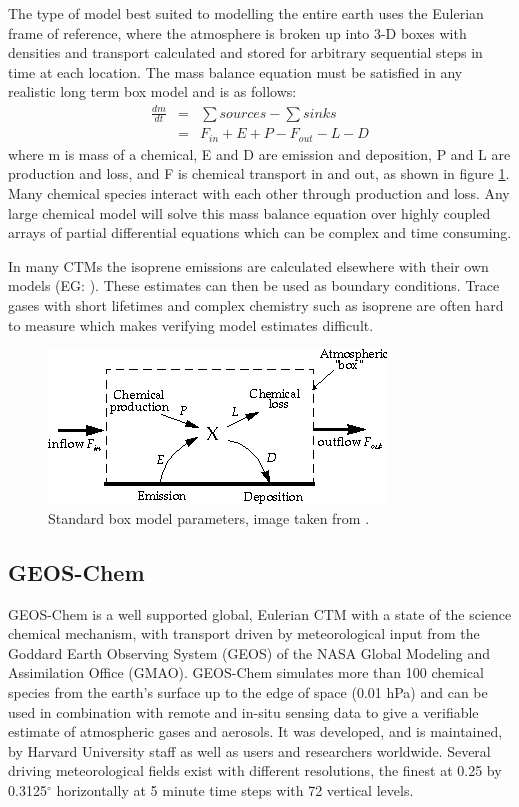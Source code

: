    The type of model best suited to modelling the entire earth uses the Eulerian frame of reference, where the atmosphere is broken up into 3-D boxes with densities and transport calculated and stored for arbitrary sequential steps in time at each location.
    The mass balance equation must be satisfied in any realistic long term box model and is as follows: 
    \begin{eqnarray*}
	\frac{dm}{dt} &=& \sum{sources}-\sum{sinks} \\
	&=& F_{in} + E + P - F_{out} - L - D 
    \end{eqnarray*}
    where m is mass of a chemical, E and D are emission and deposition, P and L are production and loss, and F is chemical transport in and out, as shown in figure \ref{ch1:fig:boxmodel}.
    Many chemical species interact with each other through production and loss. 
    Any large chemical model will solve this mass balance equation over highly coupled arrays of partial differential equations which can be complex and time consuming.

      
    In many CTMs the isoprene emissions are calculated elsewhere with their own models (EG: \citet{Guenther2006}). These estimates can then be used as boundary conditions. Trace gases with short lifetimes and complex chemistry such as isoprene are often hard to measure which makes verifying model estimates difficult.

    \begin{figure}
      \includegraphics{Figures/boxmodel.png}
      \caption{ Standard box model parameters, image taken from \citet{Jacob_1999_book}. }
      \label{ch1:fig:boxmodel}
    \end{figure}

    
  \subsection{GEOS-Chem}
  
    GEOS-Chem is a well supported global, Eulerian CTM with a state of the science chemical mechanism, with transport driven by meteorological input from the Goddard Earth Observing System (GEOS) of the NASA Global Modeling and Assimilation Office (GMAO).
    GEOS-Chem simulates more than 100 chemical species from the earth's surface up to the edge of space (0.01 hPa) and can be used in combination with remote and in-situ sensing data to give a verifiable estimate of atmospheric gases and aerosols.
    It was developed, and is maintained, by Harvard University staff as well as users and researchers worldwide. 
    Several driving meteorological fields exist with different resolutions, the finest at 0.25 by 0.3125$^\circ$ horizontally at 5 minute time steps with 72 vertical levels.

